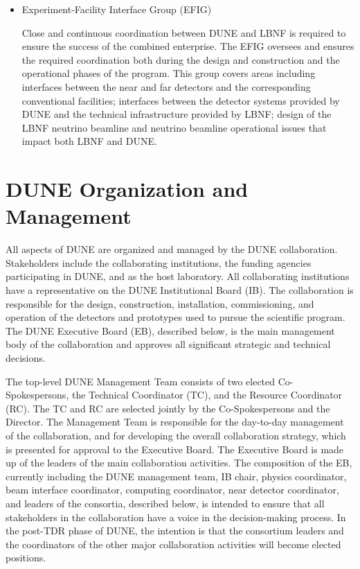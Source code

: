 \begin{itemize}
\item Experiment-Facility Interface Group (EFIG)

Close and continuous coordination between DUNE and LBNF is required to ensure the success of the combined enterprise. The EFIG  oversees and ensures the required coordination both during the design and construction and the operational phases of the program. This group covers areas including interfaces between the near and far detectors and the corresponding conventional facilities; interfaces between the detector systems provided by DUNE and the technical infrastructure provided by LBNF; design of the LBNF neutrino beamline and neutrino beamline operational issues that impact both LBNF and DUNE.  

\end{itemize}


\section{DUNE Organization and Management}

All aspects of DUNE are organized and managed by the DUNE collaboration.  Stakeholders include the collaborating institutions, the funding agencies participating in DUNE, and \fnal as the host laboratory.  All collaborating institutions have a representative on the DUNE Institutional Board (IB). The collaboration is responsible for the design, construction, installation, commissioning, and operation of the detectors and prototypes used to pursue the scientific program. The DUNE Executive Board (EB), described below, is the main management body of the collaboration and approves all significant strategic and technical decisions.

The top-level DUNE Management Team consists of two elected Co-Spokespersons, the Technical Coordinator (TC), and the Resource Coordinator (RC). The TC and RC are selected jointly by the Co-Spokespersons and the \fnal Director. The Management Team is responsible for the day-to-day management of the collaboration, and for developing the overall collaboration strategy, which is presented for approval to the Executive Board. The Executive Board is made up of the leaders of the main collaboration activities. The composition of the EB, currently including the DUNE management team, IB chair, physics coordinator, beam interface coordinator, computing coordinator, near detector coordinator, and leaders of the  consortia, described below, is intended to ensure
that all stakeholders in the collaboration have a voice in the decision-making process. 
In the post-TDR phase of DUNE, the intention is that the consortium leaders and the coordinators of the other major collaboration activities will become elected positions.

